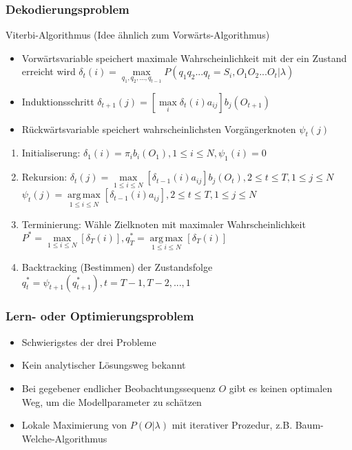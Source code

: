 \documentclass[paper=a4, fontsize=11pt]{scrartcl} %
\numberwithin{equation}{section} %
\numberwithin{figure}{section} %
\numberwithin{table}{section} %
\DeclareMathOperator*{\argmax}{arg\,max}
\begin{document}
\subsubsection{Dekodierungsproblem}

Viterbi-Algorithmus (Idee ähnlich zum Vorwärts-Algorithmus)
\begin{itemize}
\item Vorwärtsvariable speichert maximale Wahrscheinlichkeit mit der ein Zustand erreicht wird $\delta_t(i) = \max\limits_{q_1,q_2,...,q_{t-1}} P(q_1q_2...q_t = S_i, O_1O_2...O_t|\lambda)$
\item Induktionsschritt $\delta_{t+1}(j) = [\max\limits_i \delta_t(i)a_{ij}] b_j(O_{t+1})$
\item Rückwärtsvariable speichert wahrscheinlichsten Vorgängerknoten $\psi_t(j)$
\end{itemize}

\begin{enumerate}
\item Initialiserung: $\delta_1(i) = \pi_i b_i(O_1), 1 \le i \le N, \psi_1(i) = 0$
\item Rekursion: $\delta_t(j) = \max\limits_{1 \le i \le N} [\delta_{t-1}(i) a_{ij}] b_j(O_t), 2 \le t \le T, 1 \le j \le N$\\ 
$\psi_t(j) = \argmax\limits_{1 \le i \le N} [\delta_{t-1}(i)a_{ij}], 2 \le t \le T, 1 \le j \le N$
\item Terminierung: Wähle Zielknoten mit maximaler Wahrscheinlichkeit $P^* = \max\limits_{1 \le i \le N}[\delta_T(i)], q_T^* = \argmax\limits_{1 \le i \le N}[\delta_T(i)]$
\item Backtracking (Bestimmen) der Zustandsfolge $q_t^* = \psi_{t+1}(q^*_{t+1}), t = T-1, T-2,...,1$
\end{enumerate}

\subsubsection{Lern- oder Optimierungsproblem}

\begin{itemize}
\item Schwierigstes der drei Probleme
\item Kein analytischer Lösungsweg bekannt
\item Bei gegebener endlicher Beobachtungssequenz $O$ gibt es keinen optimalen Weg, um die Modellparameter zu schätzen
\item Lokale Maximierung von $P(O|\lambda)$ mit iterativer Prozedur, z.B. Baum-Welche-Algorithmus
\end{itemize}
\end{document}
